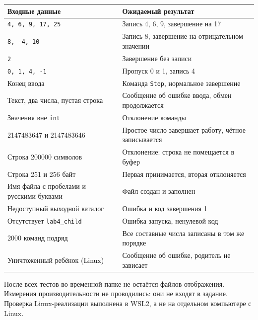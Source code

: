 \begin{center}
\begin{tabular}{p{}p{}}
Входные данные & Ожидаемый результат \\
\hline
\texttt{4, 6, 9, 17, 25} & Запись 4, 6, 9, завершение на 17 \\
\texttt{8, -4, 10} & Запись 8, завершение на отрицательном значении \\
\texttt{2} & Завершение без записи \\
\texttt{0, 1, 4, -1} & Пропуск 0 и 1, запись 4 \\
Конец ввода & Команда \texttt{Stop}, нормальное завершение \\
Текст, два числа, пустая строка & Сообщение об ошибке ввода, обмен продолжается \\
Значения вне \texttt{int} & Отклонение команды \\
2147483647 и 2147483646 & Простое число завершает работу, чётное записывается \\
Строка 200000 символов & Отклонение: строка не помещается в буфер \\
Строка 251 и 256 байт & Первая принимается, вторая отклоняется \\
Имя файла с пробелами и русскими буквами & Файл создан и заполнен \\
Недоступный выходной каталог & Ошибка и код завершения 1 \\
Отсутствует \texttt{lab4\_child} & Ошибка запуска, ненулевой код \\
2000 команд подряд & Все составные числа записаны в том же порядке \\
Уничтоженный ребёнок (Linux) & Сообщение об ошибке, родитель не зависает \\
\end{tabular}
\end{center}

После всех тестов во временной папке не остаётся файлов отображения. Измерения производительности не проводились: они не входят в задание. Проверка Linux-реализации выполнена в WSL2, а не на отдельном компьютере с Linux.
